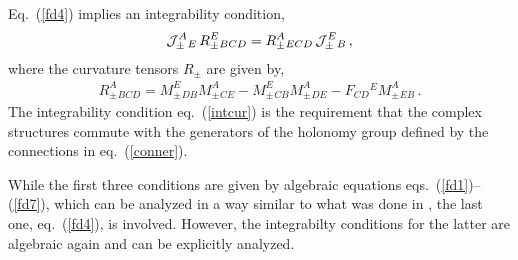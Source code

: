 \documentclass[12pt]{article}
\begin{document}
\begin{enumerate}
Eq.~(\ref{fd4}) implies an integrability condition,
\begin{eqnarray}
{\cal J}_\pm^A{}_E \,R_\pm^E{}_{BCD}=R_\pm^A{}_{ECD}\, {\cal J}_\pm^E{}_B\,,  \label{intcur}
\end{eqnarray}  
where the curvature tensors $R_\pm$ are given by,
\begin{eqnarray}
R^{A}_\pm{}_{BCD} = M_\pm^{E}{}_{DB} M_\pm^{A}{}_{CE} -  M_\pm^{E}{}_{CB} M_\pm^{A}{}_{DE}-F_{CD}{}^{E} M_\pm^{A}{}_{EB}\,.\label{curvdef}
\end{eqnarray} 
The integrability condition eq.~(\ref{intcur}) is the requirement that the complex structures commute with the generators of the holonomy group defined by the connections in eq.~(\ref{conner}). 
\end{enumerate}

While the first three conditions are given by algebraic equations eqs.~(\ref{fd1})--(\ref{fd7}), which can be analyzed in a way similar to what was done in  \cite{Spindel:1988nh,Spindel:1988sr}, the last one, eq.~(\ref{fd4}), is involved. However, the integrabilty conditions for the latter are algebraic again and can be explicitly analyzed.
\end{document}
